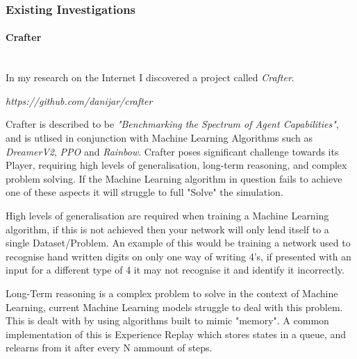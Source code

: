 \begin{flushleft}
            \subsubsection{Existing Investigations} 
                \paragraph{Crafter} \mbox{} \\
                    \vspace{0.2cm}
                        In my research on the Internet I discovered a project called \textit{Crafter}. \\

                        \vspace{0.2cm}
                        \centerline{\textit{https://github.com/danijar/crafter}}
                        \vspace{0.2cm}

                        Crafter is described to be \textit{"Benchmarking the Spectrum of Agent Capabilities"}, and is utlised
                        in conjunction with Machine Learning Algorithms such as \textit{DreamerV2}, \textit{PPO} and \textit{Rainbow}. Crafter poses significant
                        challenge towards its Player, requiring high levels of generalisation, long-term reasoning, and complex 
                        problem solving. If the Machine Learning algorithm in question fails to achieve one of these aspects it will 
                        struggle to full "Solve" the simulation. \\

                        \vspace{0.2cm}

                        High levels of generalisation are required when training a Machine Learning algorithm, if this is not achieved then
                        your network will only lend itself to a single Dataset/Problem. An example of this would be training a network used
                        to recognise hand written digits on only one way of writing 4's, if presented with an input for a different type of 
                        4 it may not recognise it and identify it incorrectly. \\
                        
                        \vspace{0.2cm}

                        Long-Term reasoning is a complex problem to solve in the context of Machine Learning, current Machine Learning models
                        struggle to deal with this problem. This is dealt with by using algorithms built to mimic "memory". A common 
                        implementation of this is Experience Replay which stores states in a queue, and relearns from it after every N ammount
                        of steps. \\


\end{flushleft}

